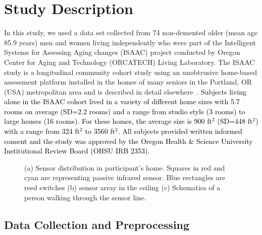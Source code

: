 \documentclass[journal]{IEEEtran}
\newcommand{\DA}[1]{\textcolor{black}{#1}}
\begin{document}
\section{Study Description }
In this study, we used a data set collected from 74 non-demented older (mean age  85.9 years) men and women living independently who were part of the Intelligent Systems for Assessing Aging changes (ISAAC) project conducted by Oregon Center for Aging and Technology (ORCATECH) Living Laboratory. The ISAAC study is a longitudinal community cohort study using an unobtrusive home-based assessment platform installed in the homes of many seniors in the Portland, OR (USA) metropolitan area and is described in detail elsewhere~\cite{Kaye2011}.  \DA{Subjects living alone in the ISAAC cohort lived in a variety of different home sizes with 5.7 rooms on average (SD=2.2 rooms) and a range from studio style (3 rooms) to large houses (16 rooms).  For these homes, the average size is 900 ft$^{2}$ (SD=448 ft$^{2}$) with a range from 324 ft$^{2}$ to 3560 ft$^{2}$.  All subjects provided written informed consent and the study was approved by the Oregon Health \& Science University Institutional Review Board (OHSU IRB 2353).}


\begin{figure}
\centering
{}
\caption{(a) Sensor distribution in participant's home. Squares in red and cyan are representing passive infrared sensor. Blue rectangles are reed switches (b) sensor array in the ceiling (c) Schematics of a person walking through the sensor line.}
\label{fig:miscelleneous}
\end{figure}

\subsection{Data Collection and Preprocessing}
\end{document}
